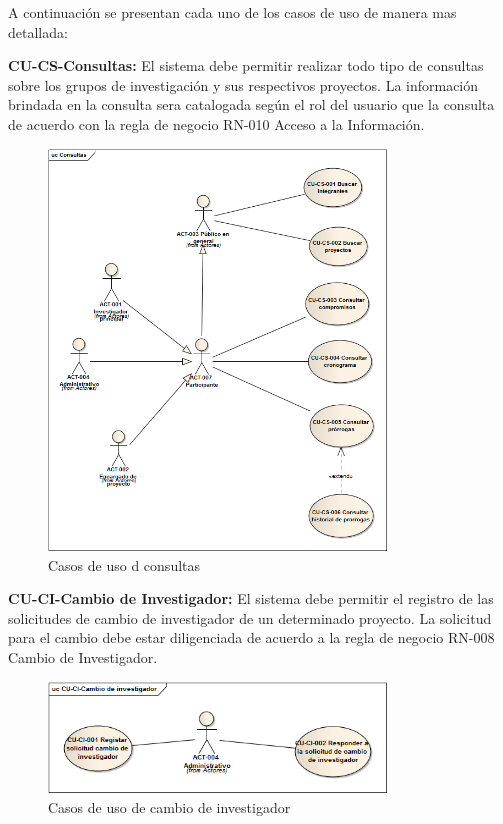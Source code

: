 \documentclass[12pt,oneside,letterpaper]{report}
\begin{document}
\maketitle A continuación se presentan cada uno de los casos de uso de manera mas detallada:

\textbf{CU-CS-Consultas:}
El sistema debe permitir realizar todo tipo de consultas sobre los grupos de investigación y sus respectivos proyectos. La información brindada en la consulta sera catalogada según el rol del usuario que la consulta de acuerdo con la regla de negocio RN-010 Acceso a la Información.

\begin{figure}[h!]
  \centering
    \includegraphics[width=0.80\textwidth]{./img/img2.png}
  \caption{Casos de uso d consultas}
\end{figure}

\textbf{CU-CI-Cambio de Investigador:}
El sistema debe permitir el registro de las solicitudes de cambio de investigador de un determinado proyecto. La solicitud para el cambio debe estar diligenciada de acuerdo a la regla de negocio RN-008 Cambio de Investigador.

\begin{figure}[h!]
  \centering
    \includegraphics[width=0.80\textwidth]{./img/img3.png}
  \caption{Casos de uso de cambio de investigador}
\end{figure}
\end{document}
